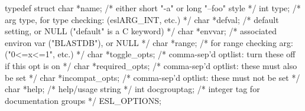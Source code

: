 \begin{cchunk}
typedef struct {
  char *name;           /* either short "-a" or long "--foo" style               */
  int   type;           /* arg type, for type checking: (eslARG_INT, etc.)       */
  char *defval;         /* default setting, or NULL ("default" is a C keyword)   */
  char *envvar;         /* associated environ var ("BLASTDB"), or NULL           */
  char *range;          /* for range checking arg: ("0<=x<=1", etc.)             */
  char *toggle_opts;    /* comma-sep'd optlist: turn these off if this opt is on */
  char *required_opts;  /* comma-sep'd optlist: these must also be set           */
  char *incompat_opts;  /* comma-sep'd optlist: these must not be set            */
  char *help;           /* help/usage string                                     */
  int   docgrouptag;    /* integer tag for documentation groups                  */
} ESL_OPTIONS;
\end{cchunk}
